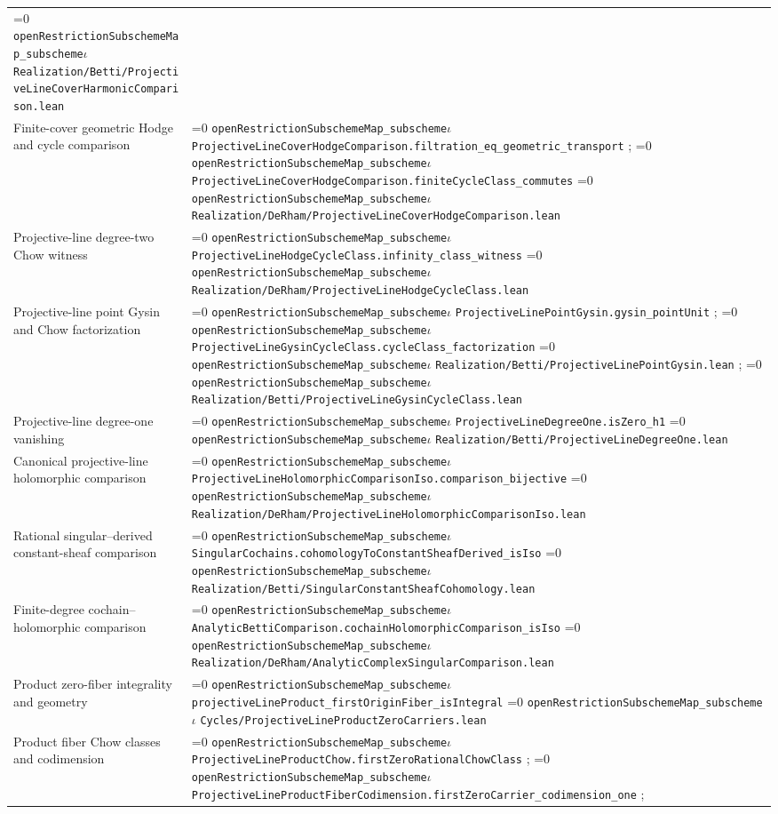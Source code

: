 \documentclass[11pt]{article}
\theoremstyle{definition}
\theoremstyle{remark}
\newcommand{\leanpath}[1]{%
  \ifnum\pdfstrcmp{\detokenize{#1}}%
      {\detokenize{openRestrictionSubschemeMap_subschemeι}}=0
    \texttt{\nolinkurl{openRestrictionSubschemeMap_subscheme}}\ensuremath{\iota}%
  \else
    \texttt{\nolinkurl{#1}}%
  \fi}
\begin{document}
\begin{longtable}{@{}>{\raggedright\arraybackslash}p{}
                >{\raggedright\arraybackslash}p{}@{}}
\leanpath{Realization/Betti/ProjectiveLineCoverHarmonicComparison.lean}\\
Finite-cover geometric Hodge and cycle comparison &
\leanpath{ProjectiveLineCoverHodgeComparison.filtration_eq_geometric_transport};
\leanpath{ProjectiveLineCoverHodgeComparison.finiteCycleClass_commutes}\newline
\leanpath{Realization/DeRham/ProjectiveLineCoverHodgeComparison.lean}\\
Projective-line degree-two Chow witness &
\leanpath{ProjectiveLineHodgeCycleClass.infinity_class_witness}\newline
\leanpath{Realization/DeRham/ProjectiveLineHodgeCycleClass.lean}\\
Projective-line point Gysin and Chow factorization &
\leanpath{ProjectiveLinePointGysin.gysin_pointUnit};
\leanpath{ProjectiveLineGysinCycleClass.cycleClass_factorization}\newline
\leanpath{Realization/Betti/ProjectiveLinePointGysin.lean};
\leanpath{Realization/Betti/ProjectiveLineGysinCycleClass.lean}\\
Projective-line degree-one vanishing &
\leanpath{ProjectiveLineDegreeOne.isZero_h1}\newline
\leanpath{Realization/Betti/ProjectiveLineDegreeOne.lean}\\
Canonical projective-line holomorphic comparison &
\leanpath{ProjectiveLineHolomorphicComparisonIso.comparison_bijective}\newline
\leanpath{Realization/DeRham/ProjectiveLineHolomorphicComparisonIso.lean}\\
Rational singular--derived constant-sheaf comparison &
\leanpath{SingularCochains.cohomologyToConstantSheafDerived_isIso}\newline
\leanpath{Realization/Betti/SingularConstantSheafCohomology.lean}\\
Finite-degree cochain--holomorphic comparison &
\leanpath{AnalyticBettiComparison.cochainHolomorphicComparison_isIso}\newline
\leanpath{Realization/DeRham/AnalyticComplexSingularComparison.lean}\\
Product zero-fiber integrality and geometry &
\leanpath{projectiveLineProduct_firstOriginFiber_isIntegral}\newline
\leanpath{Cycles/ProjectiveLineProductZeroCarriers.lean}\\
Product fiber Chow classes and codimension &
\leanpath{ProjectiveLineProductChow.firstZeroRationalChowClass};
\leanpath{ProjectiveLineProductFiberCodimension.firstZeroCarrier_codimension_one};

\end{longtable}
\end{document}
